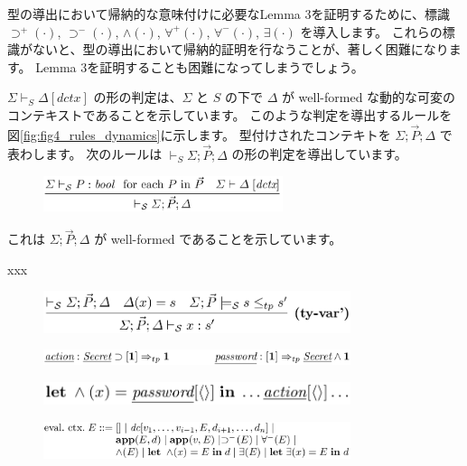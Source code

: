 \documentclass[submit,techreq,noauthor,onecolumn]{ipsj}
\begin{document}
型の導出において帰納的な意味付けに必要なLemma 3を証明するために、標識 $\supset^+(\cdot)$, $\supset^-(\cdot)$, $\wedge(\cdot)$, $\forall^+(\cdot)$, $\forall^-(\cdot)$, $\exists(\cdot)$ を導入します。
これらの標識がないと、型の導出において帰納的証明を行なうことが、著しく困難になります。
Lemma 3を証明することも困難になってしまうでしょう。

$\Sigma \vdash_S \Delta [dctx]$ の形の判定は、$\Sigma$ と $S$ の下で $\Delta$ が well-formed な動的な可変のコンテキストであることを示しています。
このような判定を導出するルールを図\ref{fig:fig4_rules_dynamics}に示します。
型付けされたコンテキトを $\Sigma; \vec{P}; \Delta$ で表わします。
次のルールは $\vdash_S \Sigma; \vec{P}; \Delta$ の形の判定を導出しています。

\begin{figure}[h]
\centering
\includegraphics[width=7cm]{img/infig22_rule_deriving.png}
\end{figure}

\noindent これは $\Sigma; \vec{P}; \Delta$ が well-formed であることを示しています。

xxx

\begin{figure}[h]
\centering
\includegraphics[width=9cm]{img/infig22_ty-var.png}
\end{figure}

\begin{figure}[h]
\centering
\includegraphics[width=9cm]{img/infig22_example2.png}
\end{figure}

\begin{figure}[h]
\centering
\includegraphics[width=9cm]{img/infig22_letin.png}
\end{figure}

\begin{figure}[h]
\centering
\includegraphics[width=9cm]{img/infig22_eval.png}
\end{figure}
\end{document}
